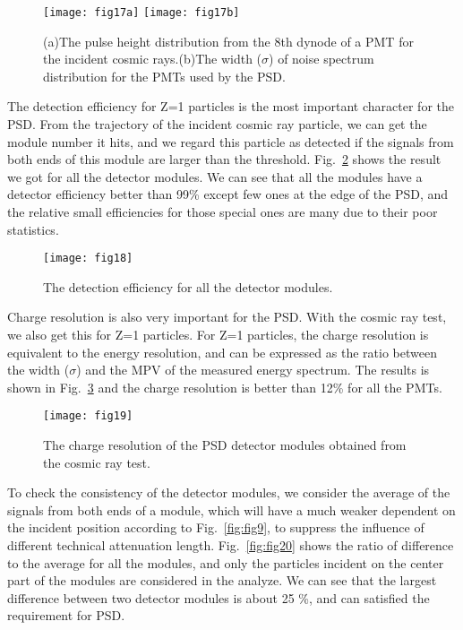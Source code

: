 \documentclass[preprint]{elsarticle}
\begin{document}
\begin{figure}[!ht]
	\centering
	\texttt{[image: fig17a]}
	\texttt{[image: fig17b]}
	\caption{(a)The pulse height distribution from the 8th dynode of a PMT for the incident cosmic rays.(b)The width ($\sigma$) of noise spectrum distribution for the PMTs used by the PSD.} \label{fig:fig17}
\end{figure}

The detection efficiency for Z=1 particles is the most important character for the PSD.
From the trajectory of the incident cosmic ray particle, we can get the module number it hits, and we regard this particle as detected if the signals from both ends of this module are larger than the threshold.
Fig.~\ref{fig:fig18} shows the result we got for all the detector modules. We can see that all the modules have a detector efficiency better than 99\% except few ones at the edge of the PSD, and the relative small efficiencies for those special ones are many due to their poor statistics.

\begin{figure}
 \centering
 \texttt{[image: fig18]}
 \caption{The detection efficiency for all the detector modules.}
 \label{fig:fig18}
\end{figure}

Charge resolution is also very important for the PSD. With the cosmic ray test, we also get this for Z=1 particles. For Z=1 particles, the charge resolution is equivalent to the energy resolution, and can be expressed as the ratio between the width ($\sigma$) and the MPV of the measured energy spectrum. The results is shown in Fig.~\ref{fig:fig19} and the charge resolution is better than 12\% for all the PMTs.

\begin{figure}
 \centering
 \texttt{[image: fig19]}
 \caption{The charge resolution of the PSD detector modules obtained from the cosmic ray test.}
\label{fig:fig19}
\end{figure}

To check the consistency of the detector modules, we consider the average of the signals from both ends of a module, which will have a much weaker dependent on the incident position according to Fig.~\ref{fig:fig9}, to suppress the influence of different technical attenuation length. Fig.~\ref{fig:fig20} shows the ratio of difference to the average for all the modules, and only the particles incident on the center part of the modules are considered in the analyze. We can see that the largest difference between two detector modules is about 25 \%, and can satisfied the requirement for PSD.
\end{document}

